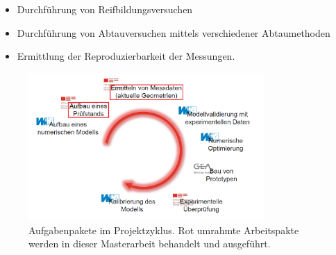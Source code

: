 \begin{itemize}
\item Durchführung von Reifbildungsversuchen
\item Durchführung von Abtauversuchen mittels verschiedener Abtaumethoden
\item Ermittlung der Reproduzierbarkeit der Messungen.
\end{itemize}




 \begin{figure}[htb]
	\centering
		\includegraphics[width=0.80\textwidth]{Pictures/Projektablauf.png}
	\caption{Aufgabenpakete im Projektzyklus.\citep{Freitag2015} Rot umrahmte Arbeitspakte werden in dieser Masterarbeit behandelt und ausgeführt.}
	\label{fig:Aufgabenpakete}
\end{figure}